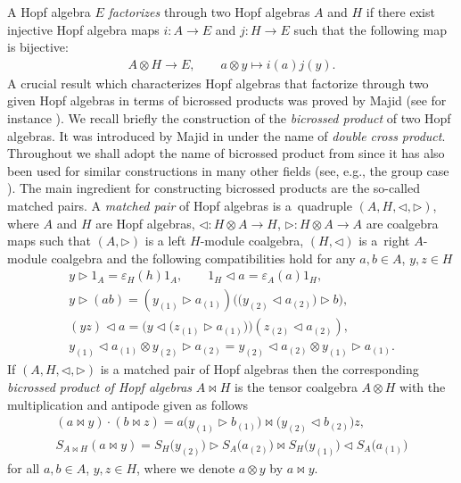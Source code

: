 \documentclass[11pt]{article}
\numberwithin{equation}{section}
\begin{document}
A Hopf algebra $E$ \emph{factorizes} through two Hopf algebras $A$ and $H$ if there exist injective Hopf algebra maps $i \colon A \to E $
and $j \colon H\to E$ such that the following map is bijective:
\begin{gather*}
A \otimes H \to E,\qquad a \otimes y \mapsto i(a) j(y).
\end{gather*}
A crucial result which characterizes Hopf algebras that factorize through two given Hopf algebras in terms of bicrossed products was proved by Majid (see for instance \cite[Theorem~7.2.3]{majid2}). We recall briefly the construction of the \emph{bicrossed product} of two Hopf algebras. It was introduced by Majid in \cite[Proposition 3.12]{majid} under the name of \emph{double cross product}. Throughout we shall adopt the name of bicrossed product from \cite[Theorem~IX 2.3]{Kassel} since it has also been used for similar constructions in many other fields (see, e.g., the group case \cite{Takeuchi}). The main ingredient for constructing bicrossed products are the so-called matched pairs. A \textit{matched pair} of Hopf algebras is a~quadruple $(A, H, \triangleleft, \triangleright)$, where $A$ and $H$ are Hopf algebras, $\triangleleft \colon H \otimes A \rightarrow H$,
$\triangleright\colon H \otimes A \rightarrow A$ are coalgebra maps such that $(A, \triangleright)$ is a left $H$-module coalgebra, $(H, \triangleleft)$ is a~right $A$-module coalgebra and the following compatibilities hold for any $a, b\in A$, $y, z\in H$
\begin{gather}
y \triangleright 1_{A} {=} \varepsilon_{H}(h)1_{A}, \qquad 1_{H} \triangleleft a = \varepsilon_{A}(a)1_{H}, \label{mp1} \\
y \triangleright(ab) {=} (y_{(1)} \triangleright a_{(1)}) \big( \big(y_{(2)}\triangleleft a_{(2)}\big)\triangleright b \big),\label{mp2} \\
(y z) \triangleleft a {=} \big( y \triangleleft \big(z_{(1)}\triangleright a_{(1)}\big) \big) (z_{(2)} \triangleleft a_{(2)}),\label{mp3} \\
y_{(1)} \triangleleft a_{(1)} \otimes y_{(2)} \triangleright a_{(2)} {=} y_{(2)} \triangleleft a_{(2)} \otimes y_{(1)}\triangleright a_{(1)}.\label{mp4}
\end{gather}
If $(A, H, \triangleleft, \triangleright)$ is a matched pair of Hopf algebras then the corresponding \textit{bicrossed product of Hopf algebras} $A \bowtie H$ is the tensor coalgebra $A\otimes H$ with the multiplication and antipode given as follows
\begin{gather*}
(a \bowtie y) \cdot (b \bowtie z) = a \big(y_{(1)}\triangleright b_{(1)}\big) \bowtie \big(y_{(2)} \triangleleft b_{(2)}\big) z, \\
S_{A \bowtie H} ( a \bowtie y ) = S_H \big(y_{(2)}\big) \triangleright S_A \big(a_{(2)}\big) \bowtie S_H \big(y_{(1)}\big) \triangleleft S_A \big(a_{(1)}\big)
\end{gather*}
for all $a,b \in A$, $y,z\in H$, where we denote $a\otimes y$ by $a\bowtie y$.
\end{document}
